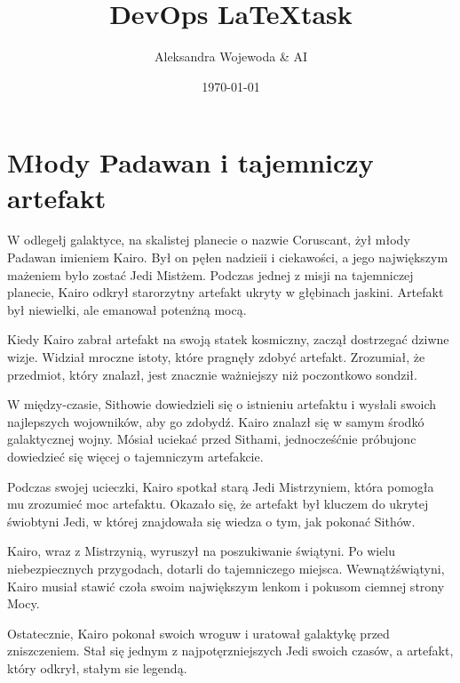 \documentclass[11pt]{article}
\title{DevOps \LaTeX task}
\author{Aleksandra Wojewoda \& AI}
\date{\today}
\begin{document}
\maketitle  

\pagebreak



\section{Młody Padawan i tajemniczy artefakt}


W odlegełj galaktyce, na skalistej planecie o nazwie Coruscant, żył 
młody Padawan imieniem Kairo. Był on pęłen nadzieii i ciekawości, 
a jego największym mażeniem było zostać Jedi Mistżem. 
Podczas jednej z misji na tajemniczej planecie, Kairo odkrył starorzytny 
artefakt ukryty w głębinach jaskini. 
Artefakt był niewielki, ale emanował potenżną mocą.

Kiedy Kairo zabrał artefakt na swoją statek kosmiczny, zaczął dostrzegać 
dziwne wizje. Widział mroczne istoty, które pragnęły zdobyć artefakt. 
Zrozumiał, że przedmiot, który znalazł, jest znacznie ważniejszy niż 
poczontkowo sondził.

W między-czasie, Sithowie dowiedzieli się o istnieniu artefaktu i wysłali 
swoich najlepszych wojowników, aby go zdobydź. 
Kairo znalazł się w samym środkó galaktycznej wojny. 
Mósiał uciekać przed Sithami, jednocześćnie próbujonc dowiedzieć się 
więcej o tajemniczym artefakcie.

Podczas swojej ucieczki, Kairo spotkał starą Jedi Mistrzyniem,
która pomogła mu zrozumieć moc artefaktu. 
Okazało się, że artefakt był kluczem do ukrytej świobtyni Jedi, 
w której znajdowała się wiedza o tym, jak pokonać Sithów.

Kairo, wraz z Mistrzynią, wyruszył na poszukiwanie świątyni. 
Po wielu niebezpiecznych przygodach, dotarli do tajemniczego miejsca. 
Wewnątżświątyni, Kairo musiał stawić czoła swoim największym lenkom 
i pokusom ciemnej strony Mocy.

Ostatecznie, Kairo pokonał swoich wroguw i uratował galaktykę przed 
zniszczeniem. 
Stał się jednym z najpotęrzniejszych Jedi swoich czasów, 
a artefakt, który odkrył, stałym sie legendą.




\end{document}
